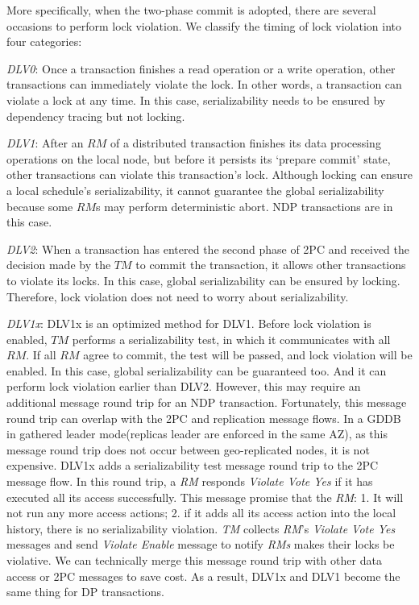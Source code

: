 \documentclass[conference]{IEEEtran}
\begin{document}
More specifically, when the two-phase commit is adopted, there are several occasions to perform lock violation.
We classify the timing of lock violation into four categories:

\emph{DLV0}:
Once a transaction finishes a read operation or a write operation, other transactions can immediately violate the lock.
In other words, a transaction can violate a lock at any time.
In this case, serializability needs to be ensured by dependency tracing but not locking.

\emph{DLV1}:
After an ${RM}$ of a distributed transaction finishes its data processing operations on the local node, but before it persists its `prepare commit' state, other transactions can violate this transaction's lock.
Although locking can ensure a local schedule's serializability, it cannot guarantee the global serializability because some ${RM}$s may perform deterministic abort.
NDP transactions are in this case.

\emph{DLV2}:
When a transaction has entered the second phase of 2PC and received the decision made by the ${TM}$ to commit the transaction, it allows other transactions to violate its locks.
In this case, global serializability can be ensured by locking. Therefore, lock violation does not need to worry about serializability.

\emph{DLV1x}:
DLV1x is an optimized method for DLV1.
Before lock violation is enabled, ${TM}$ performs a serializability test, in which it communicates with all ${RM}$.
If all ${RM}$ agree to commit, the test will be passed, and lock violation will be enabled.
In this case, global serializability can be guaranteed too. And it can perform lock violation earlier than DLV2.
However, this may require an additional message round trip for an NDP transaction.
Fortunately, this message round trip can overlap with the 2PC and replication message flows.
In a GDDB in gathered leader mode(replicas leader are enforced in the same AZ), as this message round trip does not occur between geo-replicated nodes, it is not expensive.
DLV1x adds a serializability test message round trip to the 2PC message flow.
In this round trip, a \emph{RM} responds \emph{Violate Vote Yes} if it has executed all its access successfully.
This message promise that the \emph{RM}: 1. It will not run any more access actions; 2. if it adds all its access action into the local history, there is no serializability violation.
\emph{TM} collects \emph{RM}'s \emph{Violate Vote Yes} messages and send \emph{Violate Enable} message to notify \emph{RMs} makes their locks be violative.
We can technically merge this message round trip with other data access or 2PC messages to save cost.
As a result, DLV1x and DLV1 become the same thing for DP transactions.
\end{document}
